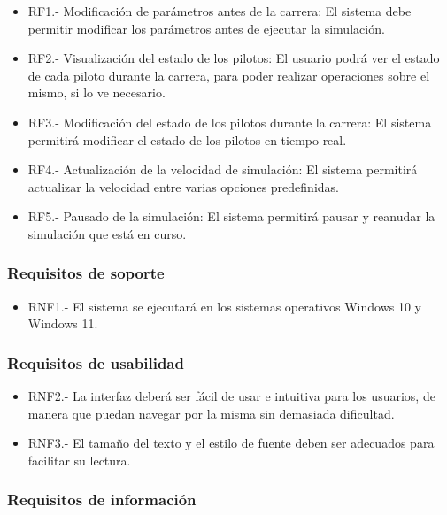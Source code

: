 \begin{itemize}
    \item RF1.- Modificación de parámetros antes de la carrera: El sistema debe permitir modificar los parámetros antes de ejecutar la simulación.
    \item RF2.- Visualización del estado de los pilotos: El usuario podrá ver el estado de cada piloto durante la carrera, para poder realizar operaciones sobre el mismo, si lo ve necesario.
    \item RF3.- Modificación del estado de los pilotos durante la carrera: El sistema permitirá modificar el estado de los pilotos en tiempo real.
    \item RF4.- Actualización de la velocidad de simulación: El sistema permitirá actualizar la velocidad entre varias opciones predefinidas.
    \item RF5.- Pausado de la simulación: El sistema permitirá pausar y reanudar la simulación que está en curso.
\end{itemize}

\subsubsection{Requisitos de soporte}

\begin{itemize}
    \item RNF1.- El sistema se ejecutará en los sistemas operativos Windows 10 y Windows 11.
\end{itemize}

\subsubsection{Requisitos de usabilidad}

\begin{itemize}
    \item RNF2.- La interfaz deberá ser fácil de usar e intuitiva para los usuarios, de manera que puedan navegar por la misma sin demasiada dificultad.
    \item RNF3.- El tamaño del texto y el estilo de fuente deben ser adecuados para facilitar su lectura.
\end{itemize}

\subsubsection{Requisitos de información}

